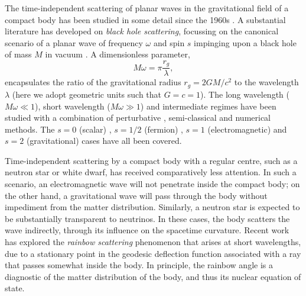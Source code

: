 \documentclass[aps,prd,longbibliography,reprint,twocolumn,amsmath,amssymb,amsfonts,showpacs,superscriptaddress]{revtex4-1}%
\begin{document}
The time-independent scattering of planar waves in the gravitational field of a compact body has been studied in some detail since the 1960s \cite{Hildreth1964PhDT64, Matzner:1968, Vishveshwara:1970}. A substantial literature has developed on \emph{black hole scattering}, focussing on the canonical scenario of a planar wave of frequency $\omega$ and spin $s$ \cite{Chrzanowski:1976jb} impinging upon a black hole of mass $M$ in vacuum \cite{Hildreth1964PhDT64, Matzner:1968, Vishveshwara:1970, Mashhoon:1973zz,Fabbri:1975,Sanchez:1977vz,MatznerRyan1978,Handler:1980un,Matzner:1985rjn,Futterman:1988ni,Andersson:1995vi,Glampedakis:2001cx,Dolan:2006vj,Dolan:2007ut,Dolan:2008kf,Crispino:2009xt,Cotaescu:2014jca,Gussmann:2016mkp}. A dimensionless parameter,
\begin{equation}
M \omega = \pi \frac{r_g}{\lambda}, 
\end{equation}
encapsulates the ratio of the gravitational radius $r_g = 2GM/c^2$ to the wavelength $\lambda$ (here we adopt geometric units such that $G=c=1$). The long wavelength ($M \omega \ll 1$), short wavelength ($M \omega \gg 1$) and intermediate regimes have been studied with a combination of perturbative \cite{DeLogi:1977dp,Dolan:2007ut,Guadagnini:2008ha,Sorge:2015yoa}, semi-classical \cite{Matzner:1985rjn, Anninos:1992ih} and numerical methods. The $s = 0$ (scalar) \cite{Matzner:1968,Sanchez:1977vz,Andersson:1995vi,Glampedakis:2001cx,Leite:2019eis}, $s=1/2$ (fermion) \cite{Dolan:2006vj,Cotaescu:2014jca}, $s=1$ (electromagnetic) \cite{Fabbri:1975, Crispino:2009xt, Crispino:2015gua} and $s=2$ (gravitational) cases \cite{MatznerRyan1978,Handler:1980un,Dolan:2008kf} have all been covered.

Time-independent scattering by a compact body with a regular centre, such as a neutron star or white dwarf, has received comparatively less attention. In such a scenario, an electromagnetic wave will not penetrate inside the compact body; on the other hand, a gravitational wave will pass through the body without impediment from the matter distribution. Similarly, a neutron star is expected to be substantially transparent to neutrinos. In these cases, the body scatters the wave indirectly, through its influence on the spacetime curvature. Recent work \cite{Dolan:2017rtj, Stratton:2019deq} has explored the \emph{rainbow scattering} phenomenon that arises at short wavelengths, due to a stationary point in the geodesic deflection function associated with a ray that passes somewhat inside the body. In principle, the rainbow angle is a diagnostic of the matter distribution of the body, and thus its nuclear equation of state. \cite{Nambu:2019sqn}
\end{document}
